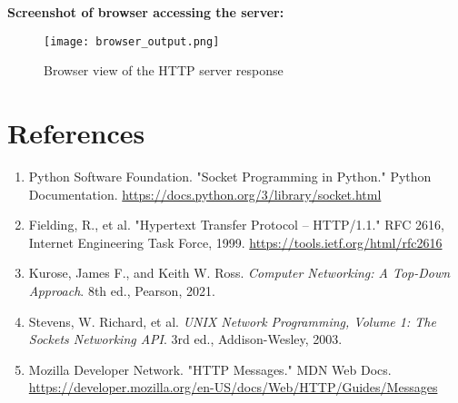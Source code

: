 \documentclass[12pt]{article}
\begin{document}
\textbf{Screenshot of browser accessing the server:}

\begin{figure}[H]
    \centering
    \texttt{[image: browser\_output.png]}
    \caption{Browser view of the HTTP server response}
    \label{fig:server_browser}
\end{figure}

\section{References}

\begin{enumerate}
    \item Python Software Foundation. "Socket Programming in Python." Python Documentation. \url{https://docs.python.org/3/library/socket.html}
    \item Fielding, R., et al. "Hypertext Transfer Protocol -- HTTP/1.1." RFC 2616, Internet Engineering Task Force, 1999. \url{https://tools.ietf.org/html/rfc2616}
    \item Kurose, James F., and Keith W. Ross. \textit{Computer Networking: A Top-Down Approach}. 8th ed., Pearson, 2021.
    \item Stevens, W. Richard, et al. \textit{UNIX Network Programming, Volume 1: The Sockets Networking API}. 3rd ed., Addison-Wesley, 2003.
    \item Mozilla Developer Network. "HTTP Messages." MDN Web Docs. \url{https://developer.mozilla.org/en-US/docs/Web/HTTP/Guides/Messages}
\end{enumerate}
\end{document}
